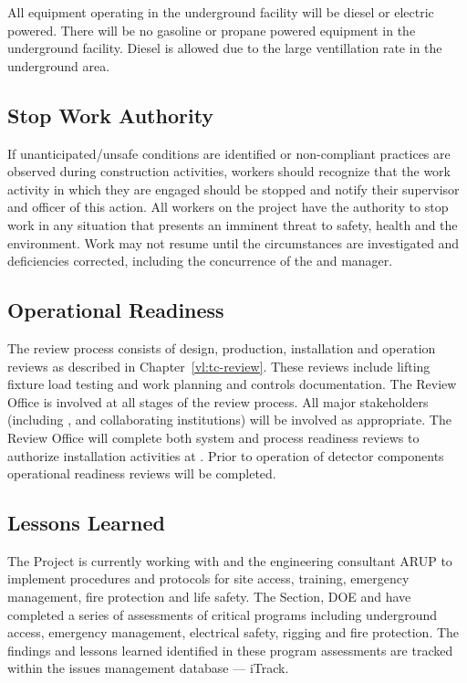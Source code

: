 All equipment operating in the underground facility will be diesel or
electric powered. There will be no gasoline or propane powered
equipment in the underground facility. Diesel is allowed due to the large
ventillation rate in the underground area.

\subsection{Stop Work Authority}

If unanticipated/unsafe conditions are identified or non-compliant
practices are observed during construction activities, workers should
recognize that the work activity in which they are engaged should be
stopped and notify their supervisor and  officer of
this action. All workers on the  project have the
authority to stop work in any situation that presents an imminent
threat to safety, health and the environment. Work may not resume
until the circumstances are investigated and deficiencies corrected,
including the concurrence of the  
and   manager.

\subsection{Operational Readiness}

The  review process consists of design, production,
installation and operation reviews as described in
Chapter~\ref{vl:tc-review}. These reviews include lifting fixture
load testing and work planning and controls documentation. The
 Review Office is involved at all stages of the review
process. All major stakeholders (including \fnal,  and
 collaborating institutions) will be involved as
appropriate. The Review Office will complete both system and process
readiness reviews to authorize installation activities at
.  Prior to operation of detector components operational
readiness reviews will be completed.

\subsection{Lessons Learned}

The  Project is currently working with  and the 
engineering consultant ARUP to implement  procedures and
protocols for site access, training, emergency management, fire
protection and life safety. The \fnal {} Section, DOE and
  have completed a series of assessments of
critical   programs including underground access,
emergency management, electrical safety, rigging and fire
protection. The findings and lessons learned identified in these
 program assessments are tracked within the \fnal issues management
database --- iTrack.

